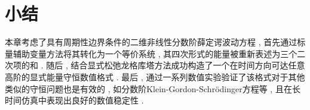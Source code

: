 \section{小结}\label{Section_SAVRRK: 7}
本章考虑了具有周期性边界条件的二维非线性分数阶薛定谔波动方程 , 首先通过标量辅助变量方法将其转化为一个等价系统 , 其四次形式的能量被重新表述为三个二次项的和 . 
随后 , 结合显式松弛龙格库塔方法成功构造了一个在时间方向可达任意高阶的显式能量守恒数值格式 . 
最后 , 通过一系列数值实验验证了该格式对于其他类似的守恒问题也是有效的 , 如分数阶Klein-Gordon-Schr{\"o}dinger方程等 , 且在长时间仿真中表现出良好的数值稳定性 . 
